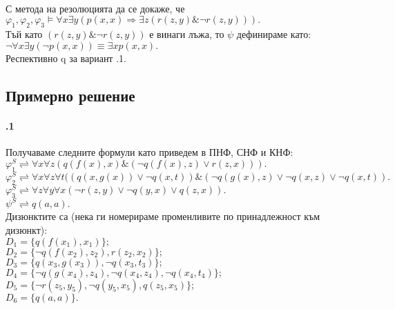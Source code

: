 \documentclass{article}
\begin{document}
\paragraph{}
С метода на резолюцията да се докаже, че \\
\indent $\varphi_1, \varphi_2, \varphi_3 \models \forall x \exists y ( p(x,x) \Longrightarrow \exists z (r(z, y)\&\neg r(z, y))).$ \\
\indent * Тъй като $(r(z, y)\&\neg r(z, y))$ е винаги лъжа, то $\psi$ дефинираме като: \\ \indent $ \neg \forall x \exists y (\neg p(x,x))  \equiv \exists x p(x,x).$ \\
\indent Респективно q за вариант .1.

\subsection{Примерно решение}
\paragraph{\hspace{0.5em} .1}
\begin{addmargin}[1em]{2em}
Получаваме следните формули като приведем в ПНФ, СНФ и КНФ: \\
$\varphi_1^S \rightleftharpoons \forall x \forall z (q(f(x), x)\&(\neg q(f(x), z)\lor r(z, x))). $ \\
$\varphi_2^S \rightleftharpoons \forall x \forall z \forall t((q(x,g(x))\lor \neg q(x,t))\&(\neg q(g(x),z) \lor \neg q(x, z) \lor \neg q(x, t)). $ \\
$\varphi_3^S \rightleftharpoons \forall z \forall y \forall x (\neg r(z,y) \lor \neg q(y,x) \lor q(z, x)). $ \\
$\psi^S \rightleftharpoons q(a,a).$ \\
Дизюнктите са (нека ги номерираме променливите по принадлежност към дизюнкт): \\
$D_1 = \{ q(f(x_1),x_1)\};$ \\
$D_2 = \{ \neg q(f(x_2),z_2), r(z_2, x_2)\};$ \\
$D_3 = \{ q(x_3, g(x_3)), \neg q(x_3, t_3)\};$ \\
$D_4 = \{ \neg q(g(x_4),z_4), \neg q(x_4, z_4), \neg q(x_4, t_4)\};$ \\
$D_5 = \{ \neg r(z_5, y_5), \neg q(y_5, x_5), q(z_5, x_5)\};$ \\
$D_6 = \{ q(a,a)\}.$
\end{addmargin}
\end{document}
